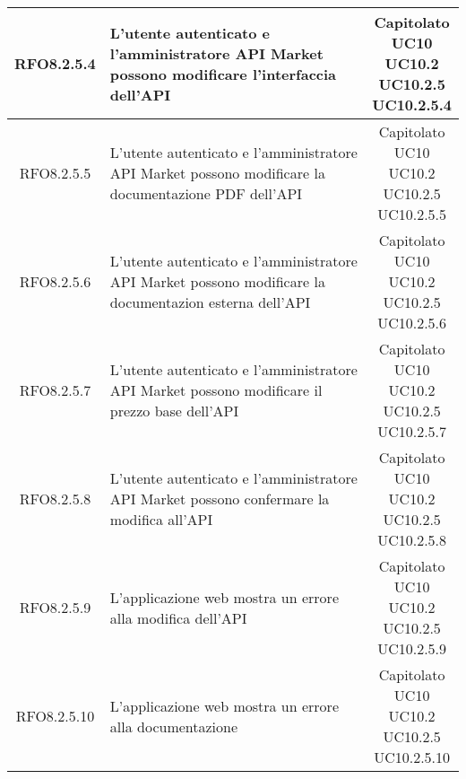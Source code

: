 \begin{longtable}{|c|p{8cm}|c|}
RFO8.2.5.4 &  L'utente autenticato e l'amministratore API Market possono modificare l'interfaccia dell'API & \makecell*{Capitolato\\UC10\\UC10.2\\UC10.2.5\\UC10.2.5.4} \\
\hline

RFO8.2.5.5 & L'utente autenticato e l'amministratore API Market possono modificare la documentazione PDF dell'API & \makecell*{Capitolato\\UC10\\UC10.2\\UC10.2.5\\UC10.2.5.5} \\
\hline

RFO8.2.5.6 &  L'utente autenticato e l'amministratore API Market possono modificare la documentazion esterna dell'API & \makecell*{Capitolato\\UC10\\UC10.2\\UC10.2.5\\UC10.2.5.6} \\
\hline

RFO8.2.5.7 &  L'utente autenticato e l'amministratore API Market possono modificare il prezzo base dell'API & \makecell*{Capitolato\\UC10\\UC10.2\\UC10.2.5\\UC10.2.5.7} \\
\hline

RFO8.2.5.8 &  L'utente autenticato e l'amministratore API Market possono confermare la modifica all'API & \makecell*{Capitolato\\UC10\\UC10.2\\UC10.2.5\\UC10.2.5.8} \\
\hline

RFO8.2.5.9 &  L'applicazione web mostra un errore alla modifica dell'API & \makecell*{Capitolato\\UC10\\UC10.2\\UC10.2.5\\UC10.2.5.9} \\
\hline

RFO8.2.5.10 &  L'applicazione web mostra un errore alla documentazione & \makecell*{Capitolato\\UC10\\UC10.2\\UC10.2.5\\UC10.2.5.10} \\
\hline


\end{longtable}
